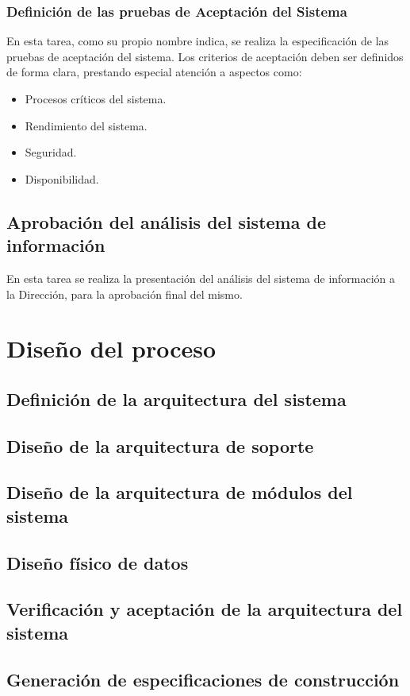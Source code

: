 \documentclass[11pt,a4paper,spanish,twoside]{report}
\begin{document}
\subsubsection{Definición de las pruebas de Aceptación del Sistema}
En esta tarea, como su propio nombre indica, se realiza la especificación
de las pruebas de aceptación del sistema. Los criterios de aceptación deben
ser definidos de forma clara, prestando especial atención a aspectos como: 
\begin{itemize}
\item Procesos críticos del sistema.
\item Rendimiento del sistema.
\item Seguridad.
\item Disponibilidad.
\end{itemize}

\subsection{Aprobación del análisis del sistema de información}
En esta tarea se realiza la presentación del análisis del sistema de
información a la Dirección, para la aprobación final del mismo.

\section{Diseño del proceso}
\subsection{Definición de la arquitectura del sistema}
\subsection{Diseño de la arquitectura de soporte}
\subsection{Diseño de la arquitectura de módulos del sistema}
\subsection{Diseño físico de datos}
\subsection{Verificación y aceptación de la arquitectura del sistema}
\subsection{Generación de especificaciones de construcción}
\end{document}
